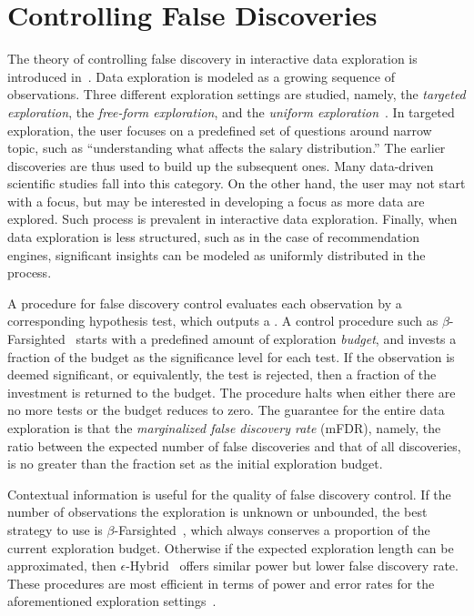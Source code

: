 \section{Controlling False Discoveries}
\label{sec:theory}

The theory of controlling false discovery in interactive data exploration is introduced in~\cite{zhao2016controlling}. 
Data exploration is modeled as a growing sequence of observations.  Three different exploration settings are studied, namely, the \textit{targeted exploration}, the \textit{free-form exploration}, and the \textit{uniform exploration}~\cite{zhao2016controlling}.  In targeted exploration, the user focuses on a predefined set of questions around narrow topic, such as ``understanding what affects the salary distribution.''  The earlier discoveries are thus used to build up the subsequent ones.  Many data-driven scientific studies fall into this category.  On the other hand, the user may not start with a focus, but may be interested in developing a focus as more data are explored.  Such process is prevalent in interactive data exploration.  Finally, when data exploration is less structured, such as in the case of recommendation engines, significant insights can be modeled as uniformly distributed in the process.

A procedure for false discovery control evaluates each observation by a corresponding hypothesis test, which outputs a \pval{}. A control procedure such as $\beta$-Farsighted~\cite{zhao2016controlling} starts with a predefined amount of exploration \textit{budget}, and invests a fraction of the budget as the significance level for each test.  If the observation is deemed significant, or equivalently, the test is rejected, then a fraction of the investment is returned to the budget. The procedure halts when either there are no more tests or the budget reduces to zero.  The guarantee for the entire data exploration is that the \textit{marginalized false discovery rate} (mFDR), namely, the ratio between the expected number of false discoveries and that of all discoveries, is no greater than the fraction set as the initial exploration budget.

Contextual information is useful for the quality of false discovery control. If the number of observations the exploration is unknown or unbounded, the best strategy to use is $\beta$-Farsighted~\cite{zhao2016controlling}, which always conserves a proportion of the current exploration budget.  Otherwise if the expected exploration length can be approximated, then $\epsilon$-Hybrid~\cite{zhao2016controlling} offers similar power but lower false discovery rate.  These procedures are most efficient in terms of power and error rates for the aforementioned exploration settings~\cite{zhao2016controlling}.

